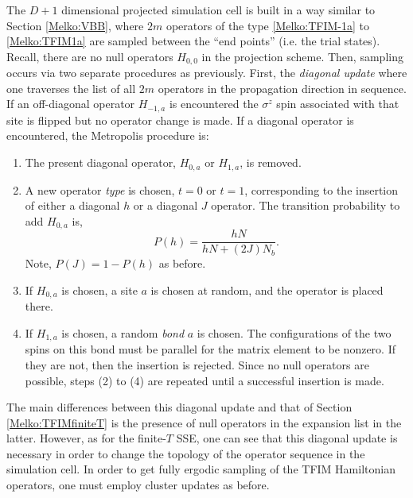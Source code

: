 \documentclass[vecphys]{svmult}
\begin{document}
The $D+1$ dimensional projected simulation cell is built in a way similar to Section \ref{Melko:VBB}, where $2m$ operators of the type \ref{Melko:TFIM-1a} to \ref{Melko:TFIM1a}  are sampled between the ``end points'' (i.e. the trial states).  Recall, there are no null operators $H_{0,0}$ in the projection scheme.  Then, sampling occurs via two separate procedures as previously.  First, the {\em diagonal update} where one traverses the list of all $2m$ operators in the propagation direction in sequence. If an off-diagonal operator $H_{-1,a}$ is encountered the $\sigma^z$ spin associated with that site is flipped but no operator change is made.  If a diagonal operator is encountered, the Metropolis procedure is:
\begin{enumerate}
\item The present diagonal operator,  $H_{0,a}$ or  $H_{1,a}$, is removed. 
\item A new operator {\em type} is chosen, $t=0$ or $t=1$, corresponding to the insertion of either a diagonal $h$ or a diagonal $J$ operator.  The transition probability to add $H_{0,a}$ is,
\begin{equation}
P(h) = \frac{h N}{hN + (2J)N_b}.
\end{equation}
Note, $P(J) = 1- P(h)$ as before. 
\item If $H_{0,a}$ is chosen, a site $a$ is chosen at random, and the operator is placed there.
\item If $H_{1,a}$ is chosen, a random {\em bond} $a$ is chosen.  The configurations of the two spins on this bond must be parallel for the matrix element to be nonzero.  If they are not, then the insertion is rejected.   Since no null operators are possible, steps (2) to (4) are repeated until a successful insertion is made.
\end{enumerate}
The main differences between this diagonal update and that of Section \ref{Melko:TFIMfiniteT} is the presence of null operators in the expansion list in the latter.  However, as for the finite-$T$ SSE, one can see that this diagonal update is necessary in order to change the topology of the operator sequence in the simulation cell.  In order to get fully ergodic sampling of the TFIM Hamiltonian operators, one must employ cluster updates as before.
\end{document}
